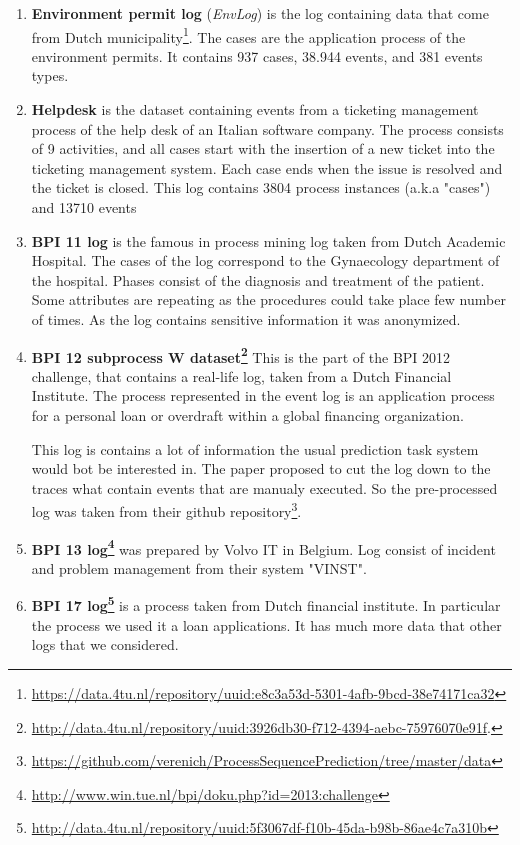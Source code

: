 \begin{enumerate}
	\item \textbf{Environment permit log} (\emph{EnvLog}) is the log containing data that come from Dutch municipality\footnote{\url{https://data.4tu.nl/repository/uuid:e8c3a53d-5301-4afb-9bcd-38e74171ca32}}. The cases are the application process of the environment permits. It contains 937 cases, 38.944 events, and 381 events types.
	\item \textbf{Helpdesk} is the dataset containing events from a ticketing management process of the help desk of an Italian software company. The process consists of 9 activities, and all cases start with the insertion of a new ticket into the ticketing
	management system. Each case ends when the issue is resolved and the ticket is closed. This log contains 3804 process instances (a.k.a "cases") and 13710 events
	\item \textbf{BPI 11 log} is the famous in process mining log taken from Dutch Academic Hospital. The cases of the log correspond to the Gynaecology department of the hospital. Phases consist of the diagnosis and treatment of the patient. Some attributes are repeating as the procedures could take place few number of times. As the log contains sensitive information it was anonymized.
	\item \textbf{BPI 12 subprocess W dataset\footnote{\url{http://data.4tu.nl/repository/uuid:3926db30-f712-4394-aebc-75976070e91f}.}} This is the part of the BPI 2012 challenge, that contains a real-life log, taken from a Dutch Financial Institute. The process represented in the event log is an application process for a personal loan or overdraft within a global financing organization. 
	
	This log is contains a lot of information the usual prediction task system would bot be interested in. The paper\cite{niek96732} proposed to cut the log down to the traces what contain events that are manualy executed. So the pre-processed log was taken from their github repository\footnote{\url{https://github.com/verenich/ProcessSequencePrediction/tree/master/data}}.
	
	\item \textbf{BPI 13 log\footnote{\url{http://www.win.tue.nl/bpi/doku.php?id=2013:challenge}}} was prepared by Volvo IT in Belgium. Log consist of incident and problem management from their system "VINST".   
	
	\item \textbf{BPI 17 log\footnote{\url{http://data.4tu.nl/repository/uuid:5f3067df-f10b-45da-b98b-86ae4c7a310b}}} is a process taken from Dutch financial institute. In particular the process we used it a loan applications. It has much more data that other logs that we considered. 
		
	
\end{enumerate}

